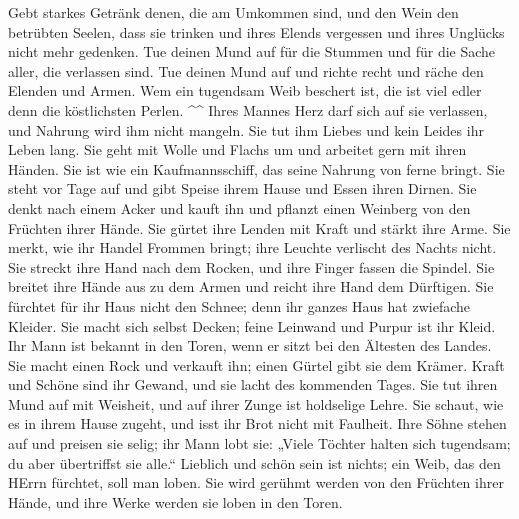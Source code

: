  Gebt starkes Getränk denen, die am Umkommen sind, und den
Wein den betrübten Seelen,  dass sie trinken und ihres
Elends vergessen und ihres Unglücks nicht mehr gedenken. 
Tue deinen Mund auf für die Stummen und für die Sache aller, die
verlassen sind.  Tue deinen Mund auf und richte recht und
räche den Elenden und Armen.  Wem ein tugendsam Weib
beschert ist, die ist viel edler denn die köstlichsten Perlen. \^{}\^{}
 Ihres Mannes Herz darf sich auf sie verlassen, und Nahrung
wird ihm nicht mangeln.  Sie tut ihm Liebes und kein Leides
ihr Leben lang.  Sie geht mit Wolle und Flachs um und
arbeitet gern mit ihren Händen.  Sie ist wie ein
Kaufmannsschiff, das seine Nahrung von ferne bringt.  Sie
steht vor Tage auf und gibt Speise ihrem Hause und Essen ihren Dirnen.
 Sie denkt nach einem Acker und kauft ihn und pflanzt einen
Weinberg von den Früchten ihrer Hände.  Sie gürtet ihre
Lenden mit Kraft und stärkt ihre Arme.  Sie merkt, wie ihr
Handel Frommen bringt; ihre Leuchte verlischt des Nachts nicht.
 Sie streckt ihre Hand nach dem Rocken, und ihre Finger
fassen die Spindel.  Sie breitet ihre Hände aus zu dem
Armen und reicht ihre Hand dem Dürftigen.  Sie fürchtet für
ihr Haus nicht den Schnee; denn ihr ganzes Haus hat zwiefache Kleider.
 Sie macht sich selbst Decken; feine Leinwand und Purpur
ist ihr Kleid.  Ihr Mann ist bekannt in den Toren, wenn er
sitzt bei den Ältesten des Landes.  Sie macht einen Rock
und verkauft ihn; einen Gürtel gibt sie dem Krämer.  Kraft
und Schöne sind ihr Gewand, und sie lacht des kommenden Tages.
 Sie tut ihren Mund auf mit Weisheit, und auf ihrer Zunge
ist holdselige Lehre.  Sie schaut, wie es in ihrem Hause
zugeht, und isst ihr Brot nicht mit Faulheit.  Ihre Söhne
stehen auf und preisen sie selig; ihr Mann lobt sie: 
„Viele Töchter halten sich tugendsam; du aber übertriffst sie alle.``
 Lieblich und schön sein ist nichts; ein Weib, das den
HErrn fürchtet, soll man loben.  Sie wird gerühmt werden
von den Früchten ihrer Hände, und ihre Werke werden sie loben in den
Toren.
